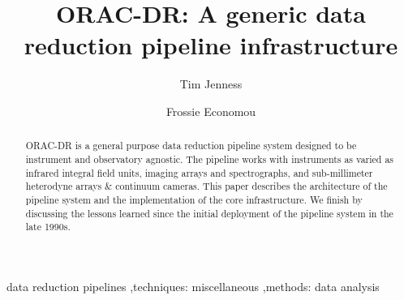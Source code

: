 \documentclass[final,authoryear,5p,times,twocolumn]{elsarticle}
\begin{document}
\begin{frontmatter}



\title{ORAC-DR: A generic data reduction pipeline infrastructure}


\author[jac]{Tim Jenness}
\author[jac]{Frossie Economou}


\address[jac]{Joint Astronomy Centre, 660 N.\ A`oh\=ok\=u Place, Hilo, HI
  96720, USA}

\begin{abstract}

  ORAC-DR is a general purpose data reduction pipeline system designed
  to be instrument and observatory agnostic. The pipeline works with
  instruments as varied as infrared integral field units, imaging
  arrays and spectrographs, and sub-millimeter heterodyne arrays \&
  continuum cameras. This paper describes the architecture of the
  pipeline system and the implementation of the core
  infrastructure. We finish by discussing the lessons learned since
  the initial deployment of the pipeline system in the late 1990s.

\end{abstract}

\begin{keyword}


data reduction pipelines \sep techniques: miscellaneous \sep methods:
data analysis

\end{keyword}

\end{frontmatter}
\end{document}
